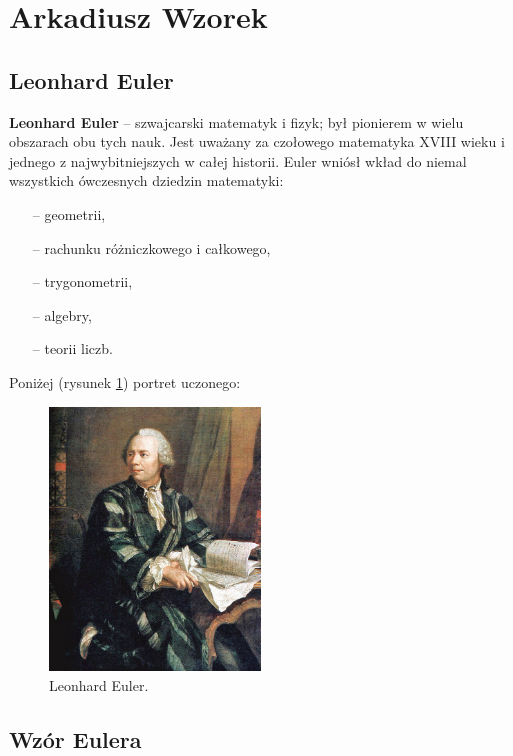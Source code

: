 \section{Arkadiusz Wzorek}
\label{sec:awzorek}

\subsection{Leonhard Euler}

\textbf{Leonhard Euler} – szwajcarski matematyk i fizyk; był pionierem w wielu obszarach obu tych nauk. Jest uważany za czołowego matematyka XVIII wieku i jednego z najwybitniejszych w całej historii. Euler wniósł wkład do niemal wszystkich ówczesnych dziedzin matematyki:

\begin{itemize}
    \item[--] geometrii,
    \item[--] rachunku różniczkowego i całkowego,
    \item[--] trygonometrii,
    \item[--] algebry,
    \item[--] teorii liczb.
\end{itemize}

\noindent Poniżej (rysunek \ref{fig:euler}) portret uczonego:

\begin{figure}[htbp]
    \centering
    \includegraphics[width=0.5\textwidth]{pictures/euler.jpg}
    \caption{Leonhard Euler.}
    \label{fig:euler}
\end{figure}

\subsection{Wzór Eulera}

